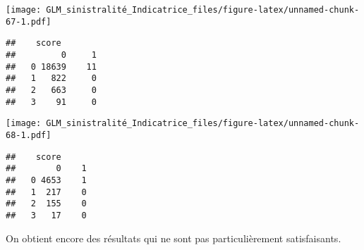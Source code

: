 \documentclass[
]{article}
\newenvironment{Shaded}{\begin{snugshade}}{\end{snugshade}}
\newcommand{\AttributeTok}[1]{\textcolor[rgb]{0.77,0.63,0.00}{#1}}
\newcommand{\FunctionTok}[1]{\textcolor[rgb]{0.00,0.00,0.00}{#1}}
\newcommand{\NormalTok}[1]{#1}
\newcommand{\OtherTok}[1]{\textcolor[rgb]{0.56,0.35,0.01}{#1}}
\newcommand{\SpecialCharTok}[1]{\textcolor[rgb]{0.00,0.00,0.00}{#1}}
\newcommand{\StringTok}[1]{\textcolor[rgb]{0.31,0.60,0.02}{#1}}
\begin{document}
\texttt{[image: GLM\_sinistralité\_Indicatrice\_files/figure-latex/unnamed-chunk-67-1.pdf]}

\begin{Shaded}
\end{Shaded}

\begin{verbatim}
##    score
##         0     1
##   0 18639    11
##   1   822     0
##   2   663     0
##   3    91     0
\end{verbatim}

\begin{Shaded}
\end{Shaded}

\texttt{[image: GLM\_sinistralité\_Indicatrice\_files/figure-latex/unnamed-chunk-68-1.pdf]}

\begin{Shaded}
\end{Shaded}

\begin{verbatim}
##    score
##        0    1
##   0 4653    1
##   1  217    0
##   2  155    0
##   3   17    0
\end{verbatim}

On obtient encore des résultats qui ne sont pas particulièrement
satisfaisants.
\end{document}
